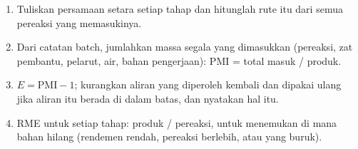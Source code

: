 \begin{method}\label{met:b3:green-industrial:metrics}
\begin{enumerate}
  \item Tuliskan persamaan setara setiap tahap dan hitunglah 
        rute itu dari semua pereaksi yang memasukinya.
  \item Dari catatan batch, jumlahkan massa segala yang dimasukkan (pereaksi,
        zat pembantu, pelarut, air, bahan pengerjaan): PMI = total masuk / produk.
  \item $E = \mathrm{PMI} - 1$; kurangkan aliran yang diperoleh kembali dan dipakai ulang jika aliran itu berada di dalam
        batas, dan nyatakan hal itu.
  \item RME untuk setiap tahap: produk / pereaksi, untuk menemukan di mana bahan hilang
        (rendemen rendah, pereaksi berlebih, atau  yang buruk).
\end{enumerate}
\end{method}

